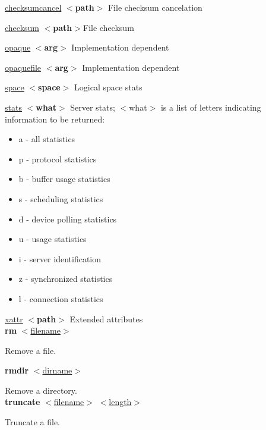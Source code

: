 \documentclass{article}
\begin{document}
		\underline{checksumcancel} \textbf{$<$path$>$} File checksum cancelation
		
        \underline{checksum} \textbf{$<$path$>$}File checksum
        
        \underline{opaque} \textbf{$<$arg$>$} Implementation dependent
        
        \underline{opaquefile} \textbf{$<$arg$>$} Implementation dependent
        
        \underline{space} \textbf{$<$space$>$} Logical space stats
        
        \begin{minipage}{\dimexpr\textwidth-\parindent}
        \underline{stats} \textbf{$<$what$>$} Server stats; $<$what$>$ is a list of letters indicating information to be returned:
        \end{minipage}
        \begin{itemize}
           \item a - all statistics
           \item p - protocol statistics
           \item b - buffer usage statistics
           \item s - scheduling statistics
           \item d - device polling statistics
           \item u - usage statistics
           \item i - server identification
           \item z - synchronized statistics
           \item l - connection statistics
        \end{itemize}
        
        \underline{xattr} \textbf{$<$path$>$} Extended attributes \\

        \noindent \textbf{rm} \underline{$<$filename$>$}
        
        \noindent Remove a file. \\

		\pagebreak
 
        \noindent \textbf{rmdir} \underline{$<$dirname$>$}
        
        \noindent Remove a directory. \\

        \noindent \textbf{truncate} \underline{$<$filename$>$} \underline{$<$length$>$}
        
        \noindent Truncate a file. \\
\end{document}
